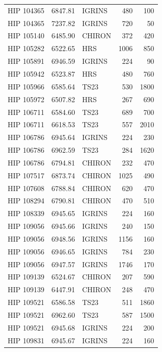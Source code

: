 {\begin{scriptsize}
\begin{longtable}{|l|rlrr|}
  HIP 104365 &  6847.81 &     IGRINS &      480 &   100 \\
  HIP 104365 &  7237.82 &     IGRINS &      720 &    50 \\
  HIP 105140 &  6485.90 &     CHIRON &      372 &   420 \\
  HIP 105282 &  6522.65 &        HRS &     1006 &   850 \\
  HIP 105891 &  6946.59 &     IGRINS &      224 &    90 \\
  HIP 105942 &  6523.87 &        HRS &      480 &   760 \\
  HIP 105966 &  6585.64 &       TS23 &      530 &  1800 \\
  HIP 105972 &  6507.82 &        HRS &      267 &   690 \\
  HIP 106711 &  6584.60 &       TS23 &      689 &   700 \\
  HIP 106711 &  6618.53 &       TS23 &      557 &  2010 \\
  HIP 106786 &  6945.64 &     IGRINS &      224 &   230 \\
  HIP 106786 &  6962.59 &       TS23 &      284 &  1620 \\
  HIP 106786 &  6794.81 &     CHIRON &      232 &   470 \\
  HIP 107517 &  6873.74 &     CHIRON &     1025 &   490 \\
  HIP 107608 &  6788.84 &     CHIRON &      620 &   470 \\
  HIP 108294 &  6790.81 &     CHIRON &      470 &   510 \\
  HIP 108339 &  6945.65 &     IGRINS &      224 &   160 \\
  HIP 109056 &  6945.66 &     IGRINS &      240 &   150 \\
  HIP 109056 &  6948.56 &     IGRINS &     1156 &   160 \\
  HIP 109056 &  6946.65 &     IGRINS &      784 &   230 \\
  HIP 109056 &  6947.57 &     IGRINS &     1746 &   170 \\
  HIP 109139 &  6524.67 &     CHIRON &      207 &   590 \\
  HIP 109139 &  6447.91 &     CHIRON &      248 &   470 \\
  HIP 109521 &  6586.58 &       TS23 &      511 &  1860 \\
  HIP 109521 &  6962.60 &       TS23 &      587 &  1500 \\
  HIP 109521 &  6945.68 &     IGRINS &      224 &   200 \\
  HIP 109831 &  6945.67 &     IGRINS &      224 &   160 \\

\end{longtable}
\end{scriptsize}}
